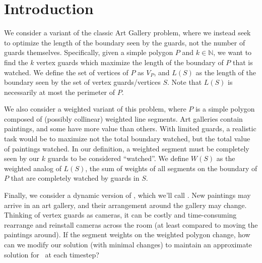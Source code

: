 \section{Introduction}
We consider a variant of the classic Art Gallery problem, where we instead seek to optimize the length of the boundary seen by the guards, not the number of guards themselves. Specifically, given a simple polygon $P$ and $k\in\mathbb{N}$, we want to find the $k$ vertex guards which maximize the length of the boundary of $P$ that is watched. We define the set of vertices of $P$ as $V_P$, and $L(S)$ as the length of the boundary seen by the set of vertex guards/vertices $S$. Note that $L(S)$ is necessarily at most the perimeter of $P$. 


We also consider a weighted variant of this problem, where $P$ is a simple polygon composed of (possibly collinear) weighted line segments. Art galleries contain paintings, and some have more value than others. With limited guards, a realistic task would be to maximize not the total boundary watched, but the total value of paintings watched. In our definition, a weighted segment must be completely seen by our $k$ guards to be considered ``watched''. We define $W(S)$ as the weighted analog of $L(S)$, the sum of weights of all segments on the boundary of $P$ that are completely watched by guards in $S$.


Finally, we consider a dynamic version of \MVVG, which we'll call \DMVVG. New paintings may arrive in an art gallery, and their arrangement around the gallery may change. Thinking of vertex guards as cameras, it can be costly and time-consuming rearrange and reinstall cameras across the room (at least compared to moving the paintings around). If the segment weights on the weighted polygon change, how can we modify our solution (with minimal changes) to maintain an approximate solution for \MVVG\ at each timestep?


